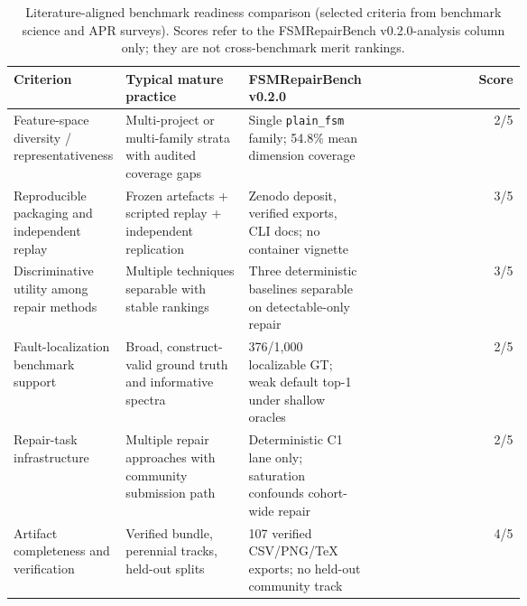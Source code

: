 \begin{table}[t]
\caption{Literature-aligned benchmark readiness comparison (selected criteria from benchmark science and APR surveys).
Scores refer to the FSMRepairBench v0.2.0-analysis column only; they are not cross-benchmark merit rankings.}
\label{tab:benchmark-readiness-literature}
\scriptsize
\setlength{\tabcolsep}{3pt}
\begin{tabular}{@{}p{0.18\linewidth}p{0.24\linewidth}p{0.24\linewidth}r@{}}
\toprule
Criterion & Typical mature practice & FSMRepairBench v0.2.0 & Score \\
\midrule
Feature-space diversity / representativeness & Multi-project or multi-family strata with audited coverage gaps & Single \texttt{plain\_fsm} family; 54.8\% mean dimension coverage & 2/5 \\
Reproducible packaging and independent replay & Frozen artefacts + scripted replay + independent replication & Zenodo deposit, verified exports, CLI docs; no container vignette & 3/5 \\
Discriminative utility among repair methods & Multiple techniques separable with stable rankings & Three deterministic baselines separable on detectable-only repair & 3/5 \\
Fault-localization benchmark support & Broad, construct-valid ground truth and informative spectra & 376/1{,}000 localizable GT; weak default top-1 under shallow oracles & 2/5 \\
Repair-task infrastructure & Multiple repair approaches with community submission path & Deterministic C1 lane only; saturation confounds cohort-wide repair & 2/5 \\
Artifact completeness and verification & Verified bundle, perennial tracks, held-out splits & 107 verified CSV/PNG/TeX exports; no held-out community track & 4/5 \\
\bottomrule
\end{tabular}
\end{table}
